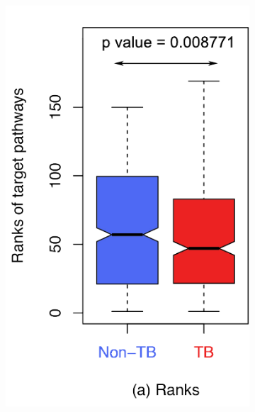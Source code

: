 \documentclass[Minh_PhD_thesis.tex]{subfiles}
\begin{document}
\begin{figure}
\centering
        \begin{subfigure}[b]{0.3\textwidth}
        \includegraphics[width=1\linewidth]{../Figures/Ranks_NonTBvsTB}
                \label{rank}
        \end{subfigure}\hspace{10mm}
        \begin{subfigure}[b]{0.3\textwidth}

\end{subfigure}
\end{figure}
\end{document}
